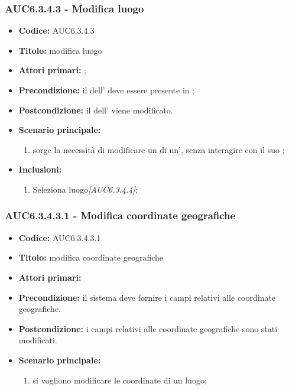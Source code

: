 \documentclass[casi-duso]{subfiles}
\begin{document}
\subsubsection{AUC6.3.4.3 - Modifica luogo}%
\label{subsub:AUC6.3.4.3}
\begin{itemize}
  \item \textbf{Codice:} AUC6.3.4.3
  \item \textbf{Titolo:} modifica luogo
  \item \textbf{Attori primari:} ;
  \item \textbf{Precondizione:} il  dell' deve essere presente in ;
  \item \textbf{Postcondizione:} il  dell' viene modificato.
  \item \textbf{Scenario principale:}
  \begin{enumerate}
    \item sorge la necessità di modificare un  di un', senza interagire con il suo ;
  \end{enumerate}
  \item \textbf{Inclusioni:}
  \begin{enumerate}
    \item Seleziona luogo\emph{[AUC6.3.4.4]};
  \end{enumerate}
\end{itemize}


\subsubsection{AUC6.3.4.3.1 - Modifica coordinate geografiche}%
\label{subsub:AUC6.3.4.3.1}
\begin{itemize}
  \item \textbf{Codice:} AUC6.3.4.3.1
  \item \textbf{Titolo:} modifica coordinate geografiche
  \item \textbf{Attori primari:} 
  \item \textbf{Precondizione:} il sistema deve fornire i campi relativi alle coordinate geografiche.
  \item \textbf{Postcondizione:} i campi relativi alle coordinate geografiche sono stati modificati.
  \item \textbf{Scenario principale:}
  \begin{enumerate}
    \item si vogliono modificare le coordinate di un luogo;
  \end{enumerate}
\end{itemize}
\end{document}

